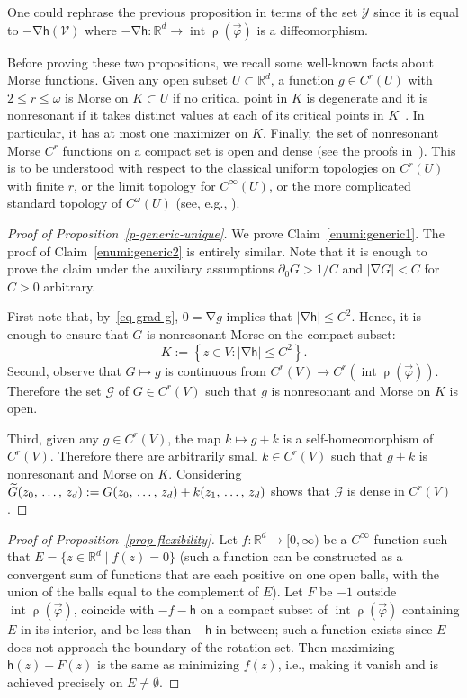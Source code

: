 \documentclass[10pt]{amsart}
\theoremstyle{definition}\newtheorem{defi}[theo]{Definition}\newtheorem{rema}[theo]{Remark}\newtheorem{exam}[theo]{Example}\newtheorem{exem}[theo]{Example}\newtheorem{nota}[theo]{Notation}
\theoremstyle{plain}
\theoremstyle{plain}
\newcommand\vpot{\vec\pot}
\newcommand\inter{\operatorname{int}}
\DeclareMathOperator{\interior}{int}
\newcommand{\rs}{\operatorname{\rho}}
\newcommand{\grad}{\operatorname{\nabla}}
\newcommand{\hf}{\mathsf{h}}
\newcommand{\pot}{\varphi}
\newcounter{In}
\newcommand*\8{\infty}
\newcommand\RR{\mathbb{R}}
\newcommand{\CG}{\mathcal{G}}
\newcommand{\scY}{\mathscr{Y}}
\newcommand{\scV}{\mathscr{V}}
\let\oldtilde\tilde
\renewcommand*{\tilde}[1]{\mathchoice{\widetilde{#1}}{\widetilde{#1}}{\oldtilde{#1}}{\oldtilde{#1}}}
\begin{document}
One could rephrase the previous proposition in terms of the set $\scY$ since it is equal to $-\grad \hf(\scV)$ where $-\grad\hf:\RR^d\to\inter\rs(\vpot)$ is a diffeomorphism.


Before proving these two propositions, we recall some well-known facts about Morse functions. Given any open subset $U\subset\RR^d$, a function $g\in C^r(U)$ with $2\leq r\leq\omega$ is Morse on $K\subset U$ if no critical point in $K$ is degenerate and it is nonresonant if it takes distinct values at each of its critical points in $K$~\cite[Definitions~1.1.7 and 1.2.11]{Nicolaescu}. In particular, it has at most one maximizer on $K$. Finally, the set of nonresonant Morse $C^r$ functions on a compact set is open and dense (see the proofs in~\cite[Section~1.2]{Nicolaescu}). This is to be understood with respect to the classical uniform topologies on $C^r(U)$ with finite $r$, or the limit topology for $C^\infty(U)$, or the more complicated standard topology of $C^\omega(U)$ (see, e.g., \cite[p.~53]{Krantz-Parks}).


\begin{proof}[Proof of Proposition~\ref{p-generic-unique}]
We prove Claim~\eqref{enumi:generic1}. The proof of Claim~\eqref{enumi:generic2} is entirely similar. Note that it is enough to prove the claim under the auxiliary assumptions $\partial_0 G>1/C$ and $\lvert \grad G\rvert < C$ for $C>0$ arbitrary.

First note that, by~\eqref{eq-grad-g}, $0=\grad g$ implies that $\lvert\grad \hf\rvert \leq C^2$. Hence, it is enough to ensure that $G$ is nonresonant Morse on the compact subset:
\[
K:=\left\{z\in V: \lvert\grad\hf\rvert\leq C^2\right\}.
\]
Second, observe that $G\mapsto g$ is continuous from $C^r(V)\to C^r(\interior\rs(\vpot))$. Therefore the set $\CG$ of $G\in C^r(V)$ such that $g$ is nonresonant and Morse on $K$ is open.

Third, given any $g\in C^r(V)$, the map $k\mapsto g+k$ is a self-homeomorphism of $C^r(V)$. Therefore there are arbitrarily small $k\in C^r(V)$ such that $g+k$ is nonresonant and Morse on $K$. Considering $\tilde G(z_0,\,\dots,\,z_d):=G(z_0,\,\dots,\,z_d)+k(z_1,\,\dots,\,z_d)$ shows that $\CG$ is dense in $C^r(V)$.
\end{proof}


\begin{proof}[Proof of Proposition~\ref{prop-flexibility}]
Let $f:\RR^d\to [0,\infty)$ be a $C^\infty$ function such that $E=\{ z\in\RR^d \mid f(z) = 0\}$ (such a function can be constructed as a convergent sum of functions that are each positive on one open balls, with the union of the balls equal to the complement of $E$). Let $F$ be $-1$ outside $\interior\rs(\vpot)$, coincide with $-f-\hf$ on a compact subset of $\interior\rs(\vpot)$ containing $E$ in its interior, and be less than $-\hf$ in between; such a function exists since $E$ does not approach the boundary of the rotation set. Then maximizing $\hf(z)+F(z)$ is the same as minimizing $f(z)$, i.e., making it vanish and is achieved precisely on $E\ne\emptyset$.
\end{proof}
\end{document}
